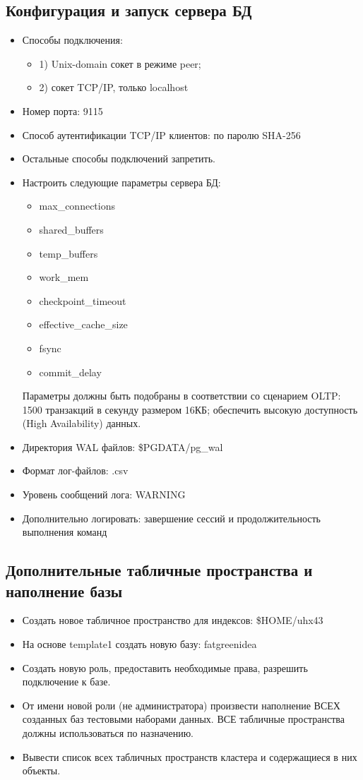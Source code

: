 \subsection{Конфигурация и запуск сервера БД}
 \begin{itemize}
	\item Способы подключения: 
	\begin{itemize}
		\item 1) Unix-domain сокет в режиме peer; 
		\item 2) сокет TCP/IP, только localhost
	\end{itemize}
	\item Номер порта: 9115
	\item Способ аутентификации TCP/IP клиентов: по паролю SHA-256
	\item Остальные способы подключений запретить.
	\item Настроить следующие параметры сервера БД:
	\begin{itemize}
			\item max\_connections
			\item shared\_buffers
			\item temp\_buffers
			\item work\_mem
			\item checkpoint\_timeout
			\item effective\_cache\_size
			\item fsync
			\item commit\_delay
	\end{itemize}
	Параметры должны быть подобраны в соответствии со сценарием OLTP:
	1500 транзакций в секунду размером 16КБ; обеспечить высокую доступность (High Availability) данных.
	\item Директория WAL файлов: \$PGDATA/pg\_wal
	\item Формат лог-файлов: .csv
	\item Уровень сообщений лога: WARNING
	\item Дополнительно логировать: завершение сессий и продолжительность выполнения команд
\end{itemize}

\subsection{Дополнительные табличные пространства и наполнение базы}
\begin{itemize}
	\item Создать новое табличное пространство для индексов: 
	\$HOME/uhx43
	\item На основе template1 создать новую базу: fatgreenidea
	\item Создать новую роль, предоставить необходимые права, разрешить подключение к базе.
	\item От имени новой роли (не администратора) произвести наполнение ВСЕХ созданных баз тестовыми наборами данных. ВСЕ табличные пространства должны использоваться по назначению.
	\item Вывести список всех табличных пространств кластера и содержащиеся в них объекты.
\end{itemize}
